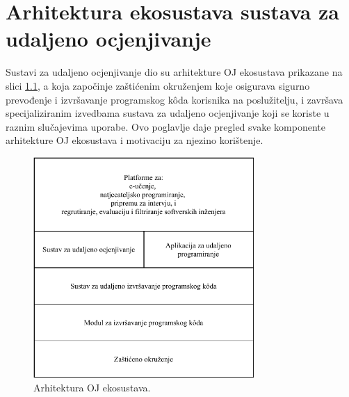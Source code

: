 \documentclass[times, utf8, diplomski]{fer}
\begin{document}
\chapter{Arhitektura ekosustava sustava za udaljeno ocjenjivanje}
\label{chap:oj-ecosystem}
Sustavi za udaljeno ocjenjivanje dio su arhitekture OJ ekosustava prikazane na slici \ref{fig:oj-ecosystem}, a koja započinje zaštićenim okruženjem  koje osigurava sigurno prevođenje i izvršavanje programskog kôda korisnika na poslužitelju, i završava specijaliziranim izvedbama sustava za udaljeno ocjenjivanje koji se koriste u raznim slučajevima uporabe. Ovo poglavlje daje pregled svake komponente arhitekture OJ ekosustava i motivaciju za njezino korištenje.

\begin{figure}[htb]
	\centering
	\includegraphics[width=0.75\textwidth]{images/Ekosustav.pdf}
	\caption{
		Arhitektura OJ ekosustava. \citep{9245310}
	}
	\label{fig:oj-ecosystem}
\end{figure}

\pagebreak
\end{document}
